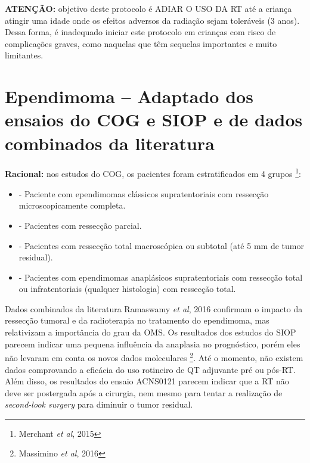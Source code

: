 \documentclass[11pt,a4paper,oldfontcommands]{memoir}
\begin{document}
\textbf{ATENÇÃO:}  objetivo deste protocolo é ADIAR O USO DA RT  até a criança atingir uma idade onde os efeitos adversos da radiação sejam toleráveis (3 anos). Dessa forma, é inadequado iniciar este protocolo em crianças com risco de complicações graves, como naquelas que têm sequelas importantes e muito limitantes.
\cleardoublepage
\section{Ependimoma  -- Adaptado dos ensaios do COG e SIOP e de dados combinados da literatura}
{\let\thefootnote\relax{}}
\small{
\textbf{Racional:} nos estudos do COG, os pacientes foram estratificados em 4 grupos \footnote{Merchant \textit{et al}, 2015}:
\begin{itemize}
\item[Estrato 1] - Paciente com ependimomas clássicos supratentoriais com ressecção microscopicamente completa.
\item[Estrato 2] - Pacientes com ressecção parcial.
\item[Estrato 3] - Pacientes com ressecção total macroscópica ou subtotal (até 5 mm de tumor residual).
\item[Estrato 4] - Pacientes com ependimomas anaplásicos supratentoriais com ressecção total ou infratentoriais (qualquer histologia) com ressecção total.
\end{itemize}

Dados combinados da literatura {Ramaswamy \textit{et al}, 2016} confirmam o impacto da ressecção tumoral e da radioterapia no tratamento do ependimoma, mas relativizam a importância do grau da OMS. Os resultados dos estudos do SIOP parecem indicar uma pequena influência da anaplasia no prognóstico, porém eles não levaram em conta os novos dados moleculares \footnote{Massimino  \textit{et al}, 2016}. Até o momento, não existem dados comprovando a eficácia do uso rotineiro de QT adjuvante pré ou pós-RT. Além disso, os resultados do ensaio ACNS0121 parecem indicar que a RT não deve ser postergada após a cirurgia, nem mesmo para tentar a realização de \textit{second-look surgery} para diminuir o tumor residual. 

}
\end{document}
